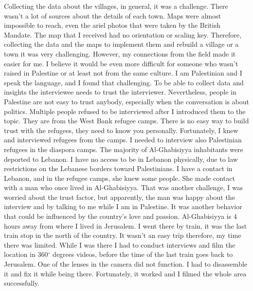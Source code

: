 Collecting the data about the villages, in general, it was a challenge. There wasn't a lot of sources about the details of each town. Maps were almost impossible to reach, even the ariel photos that were taken by the British Mandate.  The map that I received had no orientation or scaling key. Therefore, collecting the data and the maps to implement them and rebuild a village or a town it was very challenging. However, my connections from the field made it easier for me. I believe it would be even more difficult for someone who wasn't raised in Palestine or at least not from the same culture. I am Palestinian and I speak the language, and I found that challenging. To be able to collect data and insights the interviewee needs to trust the interviewer. Nevertheless, people in Palestine are not easy to trust anybody, especially when the conversation is about politics. Multiple people refused to be interviewed after I introduced them to the topic. They are from the West Bank refugee camps. There is no easy way to build trust with the refugees, they need to know you personally. Fortunately, I knew and interviewed refugees from the camps. I needed to interview also Palestinian refugees in the diaspora camps. The majority of Al-Ghabisiyya inhabitants were deported to Lebanon. I have no access to be in Lebanon physically, due to law restrictions on the Lebanese borders toward Palestinians. I have a contact in Lebanon, and in the refugee camps, she knew some people. She made contact with a man who once lived in Al-Ghabisiyya. That was another challenge, I was worried about the trust factor, but apparently, the man was happy about the interview and by talking to me while I am in Palestine. It was another behavior that could be influenced by the country's love and passion.  Al-Ghabisiyya is 4 hours away from where I lived in Jerusalem. I went there by train, it was the last train stop in the north of the country. It wasn't an easy trip therefore, my time there was limited. While I was there I had to conduct interviews and film the location in 360$^{\circ}$ degrees videos, before the time of the last train goes back to Jerusalem. One of the lenses in the camera did not function. I had to disassemble it and fix it while being there. Fortunately, it worked and I filmed the whole area successfully. 
